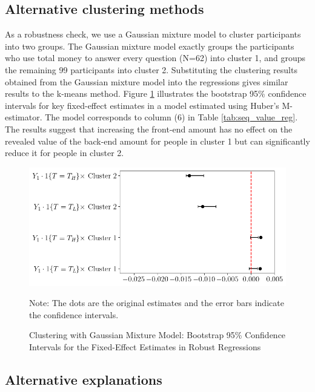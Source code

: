 \documentclass[
  12pt,
]{article}
\begin{document}
\hypertarget{alternative-clustering-methods}{%
\subsection{Alternative clustering
methods}\label{alternative-clustering-methods}}

As a robustness check, we use a Gaussian mixture model to cluster
participants into two groups. The Gaussian mixture model exactly groups
the participants who use total money to answer every question (N=62)
into cluster 1, and groups the remaining 99 participants into cluster 2.
Substituting the clustering results obtained from the Gaussian mixture
model into the regressions gives similar results to the k-means method.
Figure \ref{fig:bootstrap_ci_gmm} illustrates the bootstrap 95\%
confidence intervals for key fixed-effect estimates in a model estimated
using Huber's M-estimator. The model corresponds to column (6) in Table
\ref{tab:seq_value_reg}. The results suggest that increasing the
front-end amount has no effect on the revealed value of the back-end
amount for people in cluster 1 but can significantly reduce it for
people in cluster 2.

\begin{figure} 
\centering
\includegraphics[width=0.85\linewidth]{figures/bootstrap_ci_label_gmm_fe.png}
\caption{Clustering with Gaussian Mixture Model: Bootstrap 95\% Confidence Intervals for the Fixed-Effect Estimates in Robust Regressions}
\vspace*{4pt}
\centering
\begin{minipage}{1.0\textwidth}
{\par\footnotesize Note: The dots are the original estimates and the error bars indicate the confidence intervals.}
\end{minipage}
\label{fig:bootstrap_ci_gmm}
\end{figure}

\hypertarget{alternative-explanations}{%
\subsection{Alternative explanations}\label{alternative-explanations}}
\end{document}
